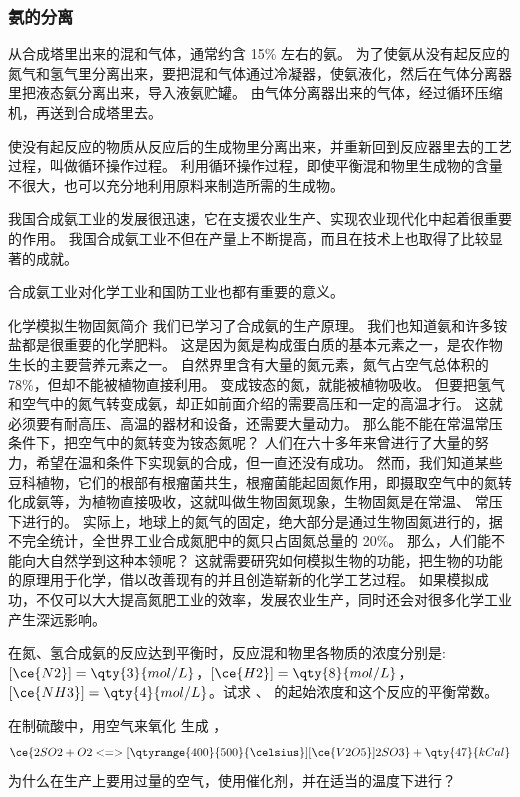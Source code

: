 \subsubsection{氨的分离}
从合成塔里出来的混和气体，通常约含 15\% 左右的氨。
为了使氨从没有起反应的氮气和氢气里分离出来，要把混和气体通过冷凝器，使氨液化，然后在气体分离器里把液态氨分离出来，导入液氨贮罐。
由气体分离器出来的气体，经过循环压缩机，再送到合成塔里去。

使没有起反应的物质从反应后的生成物里分离出来，并重新回到反应器里去的工艺过程，叫做循环操作过程。
利用循环操作过程，即使平衡混和物里生成物的含量不很大，也可以充分地利用原料来制造所需的生成物。

我国合成氨工业的发展很迅速，它在支援农业生产、实现农业现代化中起着很重要的作用。
我国合成氨工业不但在产量上不断提高，而且在技术上也取得了比较显著的成就。

合成氨工业对化学工业和国防工业也都有重要的意义。

\begin{Reading}{化学模拟生物固氮简介}
我们已学习了合成氨的生产原理。
我们也知道氨和许多铵盐都是很重要的化学肥料。
这是因为氮是构成蛋白质的基本元素之一，是农作物生长的主要营养元素之一。
自然界里含有大量的氮元素，氮气占空气总体积的 78\%，但却不能被植物直接利用。
变成铵态的氮，就能被植物吸收。
但要把氢气和空气中的氮气转变成氨，却正如前面介绍的需要高压和一定的高温才行。
这就必须要有耐高压、高温的器材和设备，还需要大量动力。
那么能不能在常温常压条件下，把空气中的氮转变为铵态氮呢？
人们在六十多年来曾进行了大量的努力，希望在温和条件下实现氨的合成，但一直还没有成功。
然而，我们知道某些豆科植物，它们的根部有根瘤菌共生，根瘤菌能起固氮作用，即摄取空气中的氮转化成氨等，为植物直接吸收，这就叫做生物固氮现象，生物固氮是在常温、 常压下进行的。
实际上，地球上的氮气的固定，绝大部分是通过生物固氮进行的，据不完全统计，全世界工业合成氮肥中的氮只占固氮总量的 20\%。
那么，人们能不能向大自然学到这种本领呢？ 
这就需要研究如何模拟生物的功能，把生物的功能的原理用于化学，借以改善现有的并且创造崭新的化学工艺过程。
如果模拟成功，不仅可以大大提高氮肥工业的效率，发展农业生产，同时还会对很多化学工业产生深远影响。
\end{Reading}

\begin{Practice}[习题]
\begin{question}
  \item 在氮、氢合成氨的反应达到平衡时，反应混和物里各物质的浓度分别是: $[\ce{N2}]=\qty{3}{mol/L}$，$[\ce{H2}]=\qty{8}{mol/L}$，$[\ce{NH3}]=\qty{4}{mol/L}$。试求 、 的起始浓度和这个反应的平衡常数。
  \item 在制硫酸中，用空气来氧化  生成 ，
  \[ \ce{ 2SO2 + O2 <=>[\text{\qtyrange{400}{500}{\celsius}}][\ce{V2O5}] 2SO3 } + \qty{47}{kCal} \]
  为什么在生产上要用过量的空气，使用催化剂，并在适当的温度下进行？
\end{question}
\end{Practice}

